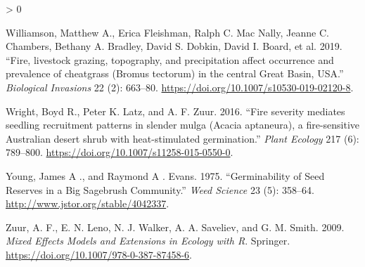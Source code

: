 \documentclass[
  12pt,
]{article}
\newlength{\cslhangindent}
\newenvironment{CSLReferences}[2] %
 {%
  \setlength{\parindent}{0pt}
  \ifodd #1 \everypar{\setlength{\hangindent}{\cslhangindent}}\ignorespaces\fi
  \ifnum #2 > 0
  \setlength{\parskip}{#2\baselineskip}
  \fi
 }%
 {}
\begin{document}
\begin{CSLReferences}{1}{0}
\leavevmode\hypertarget{ref-Williamson2019}{}%
Williamson, Matthew A., Erica Fleishman, Ralph C. Mac Nally, Jeanne C.
Chambers, Bethany A. Bradley, David S. Dobkin, David I. Board, et al.
2019. {``{Fire, livestock grazing, topography, and precipitation affect
occurrence and prevalence of cheatgrass (Bromus tectorum) in the central
Great Basin, USA}.''} \emph{Biological Invasions} 22 (2): 663--80.
\url{https://doi.org/10.1007/s10530-019-02120-8}.

\leavevmode\hypertarget{ref-Wright2016}{}%
Wright, Boyd R., Peter K. Latz, and A. F. Zuur. 2016. {``{Fire severity
mediates seedling recruitment patterns in slender mulga (Acacia
aptaneura), a fire-sensitive Australian desert shrub with
heat-stimulated germination}.''} \emph{Plant Ecology} 217 (6): 789--800.
\url{https://doi.org/10.1007/s11258-015-0550-0}.

\leavevmode\hypertarget{ref-Young1975}{}%
Young, James A ., and Raymond A . Evans. 1975. {``{Germinability of Seed
Reserves in a Big Sagebrush Community}.''} \emph{Weed Science} 23 (5):
358--64. \url{http://www.jstor.org/stable/4042337}.

\leavevmode\hypertarget{ref-Zuur2009}{}%
Zuur, A. F., E. N. Leno, N. J. Walker, A. A. Saveliev, and G. M. Smith.
2009. \emph{{Mixed Effects Models and Extensions in Ecology with R}}.
Springer. \url{https://doi.org/10.1007/978-0-387-87458-6}.

\end{CSLReferences}
\end{document}
